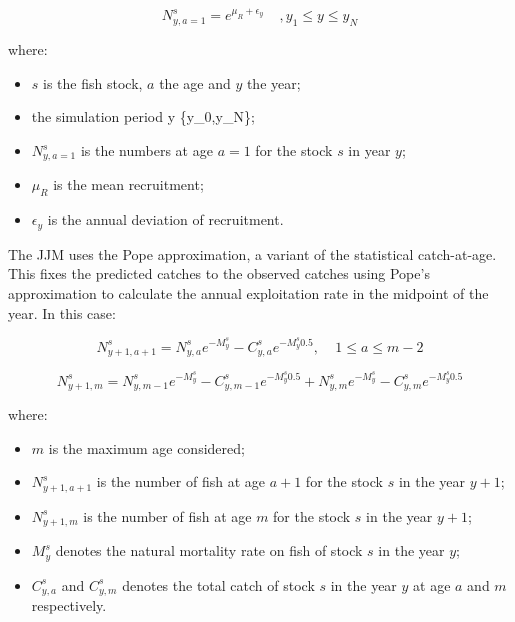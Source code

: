 \documentclass{article}
\begin{document}
\begin{equation}
N^s_{y,a=1}=e^{\mu_R+\epsilon_{y}}  \ \ \ \ \ , y_{1}\leq y \leq y_{N}
\end{equation}

where:
\begin{itemize}
    \item $s$ is the fish stock, $a$ the age and $y$ the year;
    
    \item the simulation period {y \in \{y_{0},y_{N}\}};

    \item $N^s_{y,a=1}$ is the numbers at age $a=1$ for the stock $s$ in year $y$;
    
    \item $\mu_R$ is the mean recruitment;

    \item $\epsilon_{y}$ is the annual deviation of recruitment.
    
\end{itemize}

The JJM uses the Pope approximation, a variant of the statistical catch-at-age. This fixes the predicted catches to the observed catches using Pope's approximation to calculate the annual exploitation rate in the midpoint of the year. In this case:

\begin{equation}
N^{s}_{y+1,a+1}=N^s_{y,a}e^{-M^s_y}-C^s_{y,a}e^{-M^s_y 0.5}, \ \ \ \ \ 1\leq a \leq m-2
\end{equation}
    
\begin{equation}
N^s_{y+1,m}=N^s_{y,m-1}e^{-M^s_y}-C^s_{y,m-1}e^{-M^s_y 0.5}+N^s_{y,m}e^{-M^s_y}-C^s_{y,m}e^{-M^s_y 0.5}
\end{equation}

where:
\begin{itemize}
    \item $m$ is the maximum age considered;
    
    \item $N^{s}_{y+1,a+1}$ is the number of fish at age $a+1$ for the stock $s$ in the year $y+1$;

    \item $N^{s}_{y+1,m}$ is the number of fish at age $m$ for the stock $s$ in the year $y+1$;

    \item $M^{s}_{y}$ denotes the natural mortality rate on fish of stock $s$ in the year $y$;

    \item $C^s_{y,a}$ and $C^s_{y,m}$ denotes the total catch of stock $s$ in the year $y$ at age $a$ and $m$ respectively.
    
\end{itemize}
\end{document}
